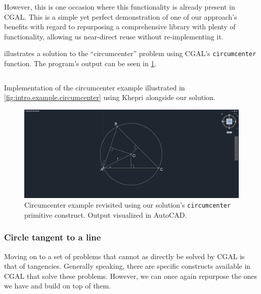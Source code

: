 However, this is one occasion where this functionality is already present in
\ac{CGAL}.  This is a simple yet perfect demonstration of one of our approach's
benefits with regard to repurposing a comprehensive library with plenty of
functionality, allowing us near-direct reuse without re-implementing it.

 illustrates a solution to the
``circumcenter'' problem using \ac{CGAL}'s \texttt{circumcenter} function.  The
program's output can be seen in \cref{fig:solution.impl.gcps.circumcenter}.

\begin{listing}[htbp]
  \inputminted[highlightlines={2,6-7,13}]{julia}{jl/ex_circumcenter.jl}
  \caption[Circumcenter example using our solution]{
    Implementation of the circumcenter example illustrated in
    \cref{fig:intro.example.circumcenter} using Khepri alongside our solution.}%
  \label{lst:solution.impl.gcps.circumcenter}
\end{listing}

\begin{figure}[htbp]
  \includegraphics[width=\linewidth]{fig/autocad-circumcenter} 
  \caption[Circumcenter example using our solution]{
    Circumcenter example revisited using our solution's \texttt{circumcenter}
    primitive construct.  Output visualized in AutoCAD.}%
    \label{fig:solution.impl.gcps.circumcenter}
\end{figure}

\subsubsection{Circle tangent to a line}%
\label{sec:solution.impl.gcps.tangcirc2line}

Moving on to a set of problems that cannot as directly be solved by \ac{CGAL} is
that of tangencies.  Generally speaking, there are specific constructs available
in \ac{CGAL} that solve these problems.  However, we can once again repurpose
the ones we have and build on top of them.

